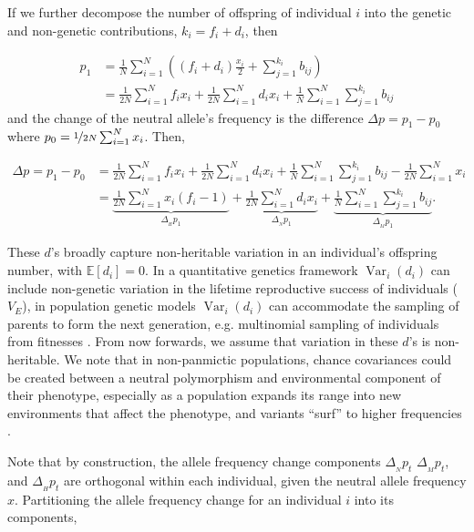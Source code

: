 \documentclass[11pt]{article}
\newcommand{\E}{\mathbb{E}}
\DeclareMathOperator{\var}{Var}
\begin{document}
If we further decompose the number of offspring of individual $i$ into the
genetic and non-genetic contributions, $k_i = f_i + d_i$, then

\begin{align}
  p_1 &= \frac{1}{N} \sum_{i=1}^N \left( (f_i + d_i) \frac{x_i}{2} + \sum_{j=1}^{k_i} b_{ij} \right) \nonumber \\
      &= \frac{1}{2N} \sum_{i=1}^N f_i x_i + \frac{1}{2N} \sum_{i=1}^N d_i x_i + \frac{1}{N} \sum_{i=1}^N  \sum_{j=1}^{k_i} b_{ij} 
\end{align}
%
and the change of the neutral allele's frequency is the difference $\Delta p = p_1 - p_0$ where $p_0 = \nicefrac{1}{2N} \sum_{i=1}^{N} x_i$. Then,

\begin{align}
\Delta p = p_1 - p_0 &= \frac{1}{2N} \sum_{i=1}^N f_i x_i + \frac{1}{2N} \sum_{i=1}^N d_i x_i + \frac{1}{N} \sum_{i=1}^N  \sum_{j=1}^{k_i} b_{ij} - \frac{1}{2N} \sum_{i=1}^N x_i \nonumber \\
                     &= \underbrace{\frac{1}{2N}\sum_{i=1}^N x_i (f_i - 1)}_{\Delta_{_H} p_1} + \underbrace{\frac{1}{2N} \sum_{i=1}^N d_i x_i}_{\Delta_{_N} p_1} + \underbrace{\frac{1}{N} \sum_{i=1}^N \sum_{j=1}^{k_i} b_{ij}}_{\Delta_{_M} p_1}.
\end{align}
%

These $d$'s broadly capture non-heritable variation in an individual's
offspring number, with $\E[d_i]=0$. In a quantitative genetics framework
$\var_i(d_i)$ can include non-genetic variation in the lifetime reproductive
success of individuals ($V_E$), in population genetic models $\var_i(d_i)$ can
accommodate the sampling of parents to form the next generation, e.g.
multinomial sampling of individuals from fitnesses \parencite{Santiago1995-hx}.
From now forwards, we assume that variation in these $d$'s is non-heritable. We
note that in non-panmictic populations, chance covariances could be created
between a neutral polymorphism and environmental component of their phenotype,
especially as a population expands its range into new environments that affect
the phenotype, and variants ``surf'' to higher frequencies
\parencite{Edmonds2004-xf,Hallatschek2008-mn,Excoffier2008-ep}.

Note that by construction, the allele frequency change components $\Delta_{_N}
p_t$ $\Delta_{_M} p_t$, and $\Delta_{_H} p_t$ are orthogonal within each
individual, given the neutral allele frequency $x$. Partitioning the allele
frequency change for an individual $i$ into its components,
\end{document}
